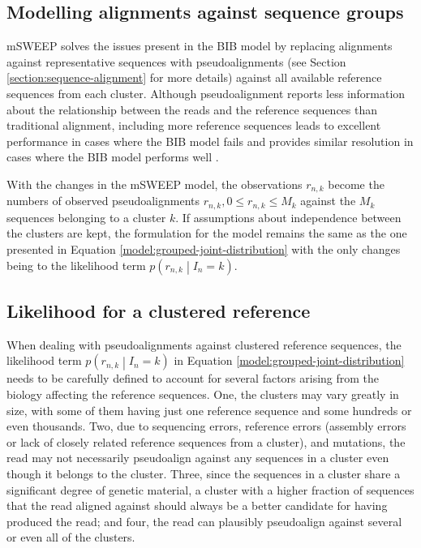 \documentclass[officiallayout]{tktla}
\begin{document}
\subsection{Modelling alignments against sequence groups}

mSWEEP solves the issues present in the BIB model by replacing
alignments against representative sequences with pseudoalignments (see
Section \ref{section:sequence-alignment} for more details) against all
available reference sequences from each cluster. Although
pseudoalignment reports less information about the relationship
between the reads and the reference sequences than traditional
alignment, including more reference sequences leads to excellent
performance in cases where the BIB model fails and provides similar
resolution in cases where the BIB model performs well
\citep{maklin_high-resolution_2021}.

With the changes in the mSWEEP model, the observations $r_{n, k}$
become the numbers of observed pseudoalignments $r_{n, k}, 0 \leq
r_{n, k} \leq M_{k}$ against the $M_{k}$ sequences belonging to a
cluster $k$. If assumptions about independence between the clusters
are kept, the formulation for the model remains the same as the one
presented in Equation \eqref{model:grouped-joint-distribution} with the
only changes being to the likelihood term $p\left(r_{n, k} \middle|
I_{n} = k\right)$.


\subsection{Likelihood for a clustered reference}

When dealing with pseudoalignments against clustered reference
sequences, the likelihood term $p\left(r_{n, k} \middle| I_{n} =
k\right)$ in Equation \eqref{model:grouped-joint-distribution} needs to
be carefully defined to account for several factors arising from the
biology affecting the reference sequences. One, the clusters may vary
greatly in size, with some of them having just one reference sequence
and some hundreds or even thousands. Two, due to sequencing errors,
reference errors (assembly errors or lack of closely related reference
sequences from a cluster), and mutations, the read may not necessarily
pseudoalign against any sequences in a cluster even though it belongs
to the cluster. Three, since the sequences in a cluster share a
significant degree of genetic material, a cluster with a higher
fraction of sequences that the read aligned against should always be a
better candidate for having produced the read; and four, the read can
plausibly pseudoalign against several or even all of the clusters.
\end{document}
